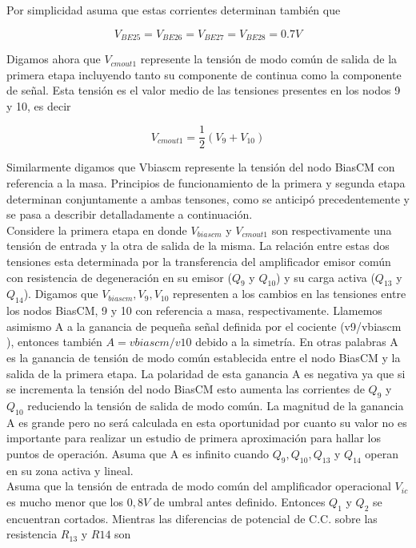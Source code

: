\documentclass[12pt,a4paper,final,headinclude,footinclude,BCOR5mm]{scrartcl}
\begin{document}
Por simplicidad asuma que estas corrientes determinan también que

$$V_{BE25} = V_{BE26} = V_{BE27} = V_{BE28} = 0.7 V$$

Digamos ahora que $V_{cmout1}$ represente la tensión de modo común de salida de la primera etapa incluyendo tanto su componente de continua como la componente de señal. Esta tensión es el valor medio de las tensiones presentes en los nodos 9 y 10, es decir

$$V_{cmout1} = \frac{1}{2} (V_{9} + V_{10})$$

Similarmente digamos que Vbiascm represente la tensión del nodo BiasCM  con referencia a la masa. Principios de funcionamiento de la primera y segunda etapa determinan conjuntamente a ambas tensones, como se anticipó precedentemente y se pasa a describir detalladamente a continuación.\\

Considere la primera etapa en donde $V_{biascm}$  y $V_{cmout1}$ son respectivamente una tensión de entrada y la otra de salida de la misma. La relación entre estas dos tensiones esta determinada por la transferencia del amplificador emisor común con resistencia de degeneración en su emisor ($Q_{9}$ y $Q_{10}$) y su carga activa ($Q_{13}$ y $Q_{14}$). Digamos que  $V_{biascm}, V_{9}, V_{10}$  representen  a los cambios en las tensiones entre los nodos BiasCM, 9 y 10  con referencia a masa, respectivamente. Llamemos asimismo A a la ganancia de pequeña señal definida por el cociente (v9/vbiascm ), entonces también  $A = vbiascm/v10$ debido a la simetría. En otras palabras A es la ganancia de tensión de modo común establecida entre el nodo BiasCM y la salida de la primera etapa. La polaridad de esta ganancia A es negativa ya que si se incrementa la tensión del nodo BiasCM esto aumenta las corrientes de $Q_{9}$ y $Q_{10}$ reduciendo la tensión de salida de modo común. La magnitud de la ganancia A es grande pero no será calculada en esta oportunidad por cuanto su valor no es importante para realizar un estudio de primera aproximación para hallar los puntos de operación. Asuma que A es infinito cuando $Q_{9},Q_{10},Q_{13}$ y $Q_{14}$ operan en su zona activa y lineal.\\

Asuma que la tensión de entrada de modo común del amplificador operacional $V_{ic}$ es mucho menor que los $0,8 V$ de umbral antes definido. Entonces $Q_{1}$ y $Q_{2}$ se encuentran cortados. Mientras las diferencias de potencial de C.C. sobre las resistencia $R_{13}$ y $R{14}$ son
\end{document}
